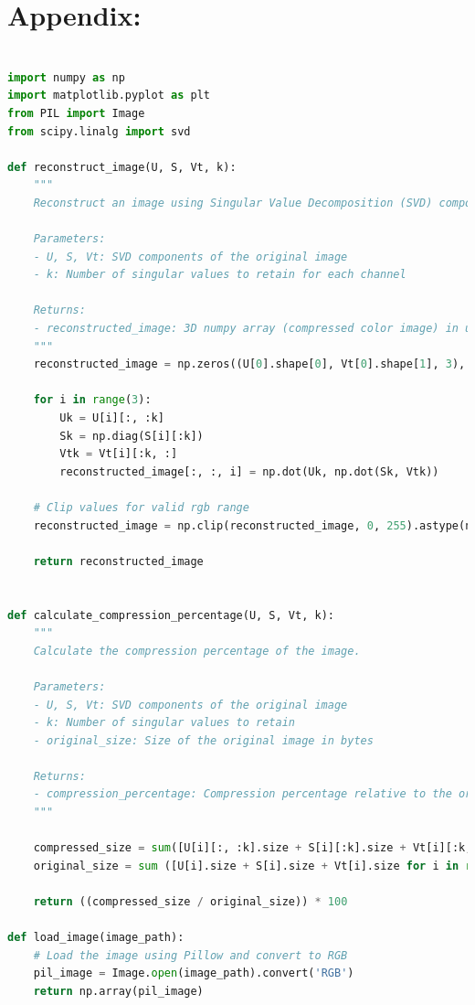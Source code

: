 \documentclass[12pt]{article}
\begin{document}



\pagebreak

\appendix
\section{Appendix:}

\begin{lstlisting}[language=Python, title={Python Code for SVD Compression}]

import numpy as np
import matplotlib.pyplot as plt
from PIL import Image
from scipy.linalg import svd

def reconstruct_image(U, S, Vt, k):
    """
    Reconstruct an image using Singular Value Decomposition (SVD) components.

    Parameters:
    - U, S, Vt: SVD components of the original image
    - k: Number of singular values to retain for each channel

    Returns:
    - reconstructed_image: 3D numpy array (compressed color image) in uint8 format
    """
    reconstructed_image = np.zeros((U[0].shape[0], Vt[0].shape[1], 3), dtype=np.float32)
    
    for i in range(3):
        Uk = U[i][:, :k]
        Sk = np.diag(S[i][:k])
        Vtk = Vt[i][:k, :]
        reconstructed_image[:, :, i] = np.dot(Uk, np.dot(Sk, Vtk))
    
    # Clip values for valid rgb range
    reconstructed_image = np.clip(reconstructed_image, 0, 255).astype(np.uint8)
    
    return reconstructed_image


def calculate_compression_percentage(U, S, Vt, k):
    """
    Calculate the compression percentage of the image.

    Parameters:
    - U, S, Vt: SVD components of the original image
    - k: Number of singular values to retain
    - original_size: Size of the original image in bytes

    Returns:
    - compression_percentage: Compression percentage relative to the original size
    """

    compressed_size = sum([U[i][:, :k].size + S[i][:k].size + Vt[i][:k, :].size for i in range(3)])
    original_size = sum ([U[i].size + S[i].size + Vt[i].size for i in range (3)])

    return ((compressed_size / original_size)) * 100

def load_image(image_path):
    # Load the image using Pillow and convert to RGB
    pil_image = Image.open(image_path).convert('RGB')
    return np.array(pil_image)


\end{lstlisting}
\end{document}
